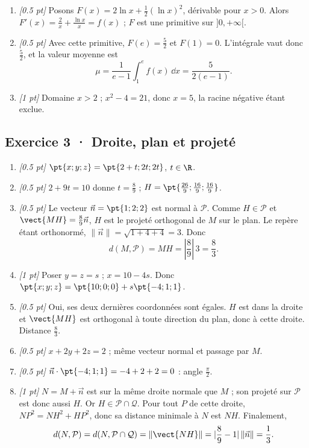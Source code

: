 \begin{enumerate}
\item \textit{[\num{0,5} pt]} Posons $F(x)=2\ln x+\frac12(\ln x)^2$, dérivable pour $x>0$. Alors $F'(x)=\frac{2}{x}+\frac{\ln x}{x}=f(x)$ ; $F$ est une primitive sur $]0,+\infty[$.

\item \textit{[\num{0,5} pt]} Avec cette primitive, $F(e)=\frac{5}{2}$ et $F(1)=0$. L'intégrale vaut donc $\frac{5}{2}$, et la valeur moyenne est
\[\mu=\frac{1}{e-1}\int_1^e f(x)\,\dd x=\frac{5}{2(e-1)}.\]

\item \textit{[1 pt]} Domaine $x>2$ ; $x^2-4=21$, donc $x=5$, la racine négative étant exclue.

\end{enumerate}

\subsection*{Exercice 3 · Droite, plan et projeté}\begin{enumerate}

\item \textit{[\num{0,5} pt]} $\pt{x;y;z}=\pt{2+t;2t;2t}$, $t\in\R$.

\item \textit{[\num{0,5} pt]} $2+9t=10$ donne $t=\frac{8}{9}$ ; $H=\pt{\frac{26}{9};\frac{16}{9};\frac{16}{9}}$.

\item \textit{[\num{0,5} pt]} Le vecteur $\vec n=\pt{1;2;2}$ est normal à $\mathcal P$. Comme $H\in\mathcal P$ et $\vect{MH}=\frac{8}{9}\vec n$, $H$ est le projeté orthogonal de $M$ sur le plan. Le repère étant orthonormé, $\|\vec n\|=\sqrt{1+4+4}=3$. Donc
\[d(M,\mathcal P)=MH=|\frac{8}{9}|\,3=\frac{8}{3}.\]

\item \textit{[1 pt]} Poser $y=z=s$ ; $x=10-4s$. Donc $\pt{x;y;z}=\pt{10;0;0}+s\pt{-4;1;1}$.

\item \textit{[\num{0,5} pt]} Oui, ses deux dernières coordonnées sont égales. $H$ est dans la droite et $\vect{MH}$ est orthogonal à toute direction du plan, donc à cette droite. Distance $\frac{8}{3}$.

\item \textit{[\num{0,5} pt]} $x+2y+2z=2$ ; même vecteur normal et passage par $M$.

\item \textit{[\num{0,5} pt]} $\vec n\cdot\pt{-4;1;1}=-4+2+2=0$ : angle $\frac{\pi}{2}$.

\item \textit{[1 pt]} $N=M+\vec n$ est sur la même droite normale que $M$ ; son projeté sur $\mathcal P$ est donc aussi $H$. Or $H\in\mathcal P\cap\mathcal Q$. Pour tout $P$ de cette droite, $NP^2=NH^2+HP^2$, donc sa distance minimale à $N$ est $NH$. Finalement,
\[d(N,\mathcal P)=d(N,\mathcal P\cap\mathcal Q)=\|\vect{NH}\|=|\frac{8}{9}-1|\,\|\vec n\|=\frac{1}{3}.\]

\end{enumerate}

